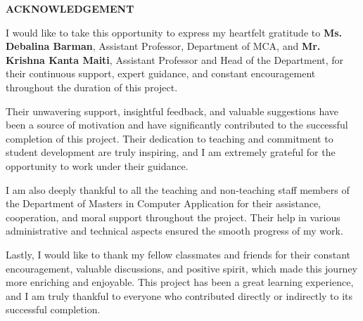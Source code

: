 \documentclass[12pt,a4paper]{report}
\begin{document}
\begin{center}
            
            \centering
            \vspace{3cm} %

            {\Huge \textbf{\textcolor{primaryblue}{ACKNOWLEDGEMENT}}} 
            
            \vspace{2.5cm} %

            \parbox{\linewidth}{ 
                \setlength{\parskip}{1.5em} %
                \onehalfspacing             %
                \large                      %
                
                I  would like to take this opportunity to express my heartfelt gratitude to \textbf{Ms. Debalina Barman}, Assistant Professor, Department of MCA, and \textbf{Mr. Krishna Kanta Maiti}, Assistant Professor and Head of the Department, for their continuous support, expert guidance, and constant encouragement throughout the duration of this project.
                
Their unwavering support, insightful feedback, and valuable suggestions have been a source of
motivation and have significantly contributed to the successful completion of this project. 
Their dedication to teaching and commitment to student development are truly inspiring, and I am extremely grateful for the opportunity to work under their guidance.

I am also deeply thankful to all the teaching and non-teaching staff members of the Department of
Masters in Computer Application for their assistance, cooperation, and moral support throughout the project. Their help in various administrative and technical aspects ensured the smooth progress of my work.

Lastly, I would like to thank my fellow classmates and friends for their constant encouragement,
valuable discussions, and positive spirit, which made this journey more enriching and enjoyable.
This project has been a great learning experience, and I am truly thankful to everyone who contributed directly or indirectly to its successful completion.
            }
\end{center}

\newpage
\end{document}
